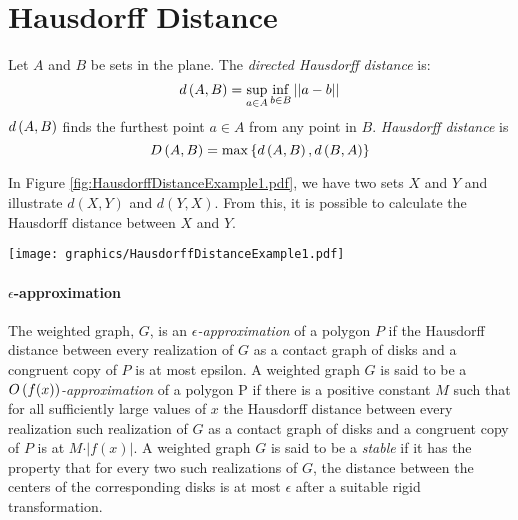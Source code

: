 
\section{Hausdorff Distance}  
Let $A$ and $B$ be sets in the plane. The \textit{directed Hausdorff distance} is: 
\begin{equation}\label{eqn:ContactGraphV3-1}
d\left( A,B \right) = \sup_{a \in A} \inf_{b \in B} \left\vert\left\vert a-b \right\vert \right\vert
\end{equation}
$d\left( A,B \right)$ finds the furthest point $a \in A$ from any point in $B$.  \textit{Hausdorff distance} is
\begin{equation}\label{eqn:ContactGraphV3-2}
D\left( A,B \right) = \max \left\lbrace d\left( A,B \right), d\left( B,A \right) \right\rbrace
\end{equation}

In Figure \ref{fig:HausdorffDistanceExample1.pdf}, we have two sets $X$ and $Y$ and illustrate $d(X,Y)$ and $d(Y,X)$.  
From this, it is possible to calculate the Hausdorff distance between $X$ and $Y$.

\begin{minipage}{\linewidth}
\begin{center}
\texttt{[image: graphics/HausdorffDistanceExample1.pdf]}
\label{fig:HausdorffDistanceExample1.pdf}
\end{center}
\end{minipage}

\paragraph{$\epsilon$-approximation}
The weighted graph, $G$, is an \textit{$\epsilon$-approximation} of a polygon $P$ if the Hausdorff distance between every realization of $G$ as a contact graph of disks and a congruent copy of $P$ is at most epsilon.  
A weighted graph $G$ is said to be a \textit{$O\left( f(x) \right)$-approximation} of a polygon P if there is a positive constant $M$ such that for all sufficiently large values of $x$ the Hausdorff distance between every realization such realization of $G$ as a contact graph of disks and a congruent copy of $P$ is at $M \cdot \vert f(x)\vert$. 
A weighted graph $G$ is said to be a \textit{stable} if it has the property that for every two such realizations of $G$, the distance between the centers of the corresponding disks is at most $\epsilon$ after a suitable rigid transformation.

